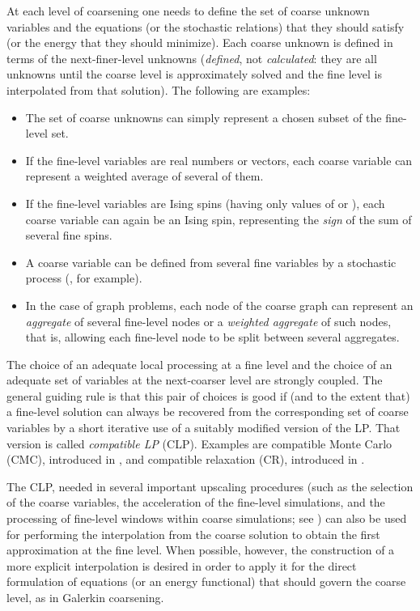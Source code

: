 \documentclass[final]{siamltex}
\begin{document}
At each level of coarsening one needs to define the set of  coarse
unknown variables and the equations (or the stochastic relations)
that they should satisfy (or the energy that they should
minimize). Each coarse unknown is defined in terms of the
next-finer-level unknowns ({\it defined}, not {\it calculated}: they  are all unknowns until the coarse level is approximately solved and the fine level is interpolated from
that solution). The following are examples:
\begin{itemize}
    \item The set of coarse unknowns can simply represent a chosen
    subset of the fine-level set.
    \item If the fine-level variables are real numbers or vectors,
    each coarse variable can represent a weighted average of
    several of them.
    \item If the fine-level variables are Ising spins (having only
    values of  or ), each coarse variable can again be an
    Ising spin, representing the {\it sign} of the sum of  several
    fine spins.
    \item A coarse variable can be defined from several fine
    variables by a stochastic process (\cite{blote96}, for example).
    \item In the case of graph problems, each node of the coarse
    graph can represent an {\it aggregate} of several fine-level
    nodes or a {\it weighted aggregate} of such nodes, that is,
    allowing each fine-level node to be split between several
    aggregates.
\end{itemize}

The choice of an adequate local processing at a fine level
and the choice of an adequate set of variables at the next-coarser level are
strongly coupled. The general guiding rule \cite{SU} is
that this pair of choices is good if (and to the extent that) a
fine-level solution can always be recovered from the corresponding
set of coarse variables by a short iterative use of a suitably
modified version of the LP. That version is called {\it compatible LP} (CLP).
Examples are compatible Monte Carlo (CMC), introduced in
\cite{brandt-renormalization}, and compatible relaxation (CR),
introduced in \cite{crs}.

The CLP, needed in several important upscaling procedures
(such as the selection of the coarse variables, the acceleration of the fine-level simulations,
and the processing of fine-level windows within coarse simulations; see
\cite{SU}) can also be used for performing the interpolation
from the coarse solution to obtain the first approximation at the
fine level. When possible, however, the construction of a more
explicit interpolation is desired in order to apply it for the direct formulation of
equations (or an energy functional) that should govern the
coarse level, as in Galerkin coarsening.
\end{document}
